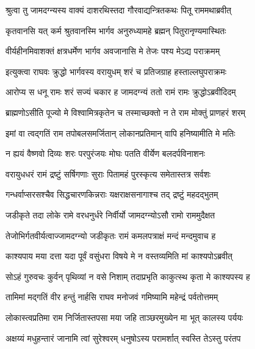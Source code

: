 
\twolineshloka
{श्रुत्वा तु जामदग्न्यस्य वाक्यं दाशरथिस्तदा}
{गौरवाद्यन्त्रितकथः पितू राममथाब्रवीत्} %

\twolineshloka
{कृतवानसि यत् कर्म श्रुतवानस्मि भार्गव}
{अनुरुध्यामहे ब्रह्मन् पितुरानृण्यमास्थितः} %

\twolineshloka
{वीर्यहीनमिवाशक्तं क्षत्रधर्मेण भार्गव}
{अवजानासि मे तेजः पश्य मेऽद्य पराक्रमम्} %

\twolineshloka
{इत्युक्त्वा राघवः क्रुद्धो भार्गवस्य वरायुधम्}
{शरं च प्रतिजग्राह हस्ताल्लघुपराक्रमः} %

\twolineshloka
{आरोप्य स धनू रामः शरं सज्यं चकार ह}
{जामदग्न्यं ततो रामं रामः क्रुद्धोऽब्रवीदिदम्} %

\twolineshloka
{ब्राह्मणोऽसीति पूज्यो मे विश्वामित्रकृतेन च}
{तस्माच्छक्तो न ते राम मोक्तुं प्राणहरं शरम्} %

\twolineshloka
{इमां वा त्वद्गतिं राम तपोबलसमर्जितान्}
{लोकानप्रतिमान् वापि हनिष्यामीति मे मतिः} %

\twolineshloka
{न ह्ययं वैष्णवो दिव्यः शरः परपुरंजयः}
{मोघः पतति वीर्येण बलदर्पविनाशनः} %

\twolineshloka
{वरायुधधरं रामं द्रष्टुं सर्षिगणाः सुराः}
{पितामहं पुरस्कृत्य समेतास्तत्र सर्वशः} %

\twolineshloka
{गन्धर्वाप्सरसश्चैव सिद्धचारणकिन्नराः}
{यक्षराक्षसनागाश्च तद् द्रष्टुं महदद्भुतम्} %

\twolineshloka
{जडीकृते तदा लोके रामे वरधनुर्धरे}
{निर्वीर्यो जामदग्न्योऽसौ रामो राममुदैक्षत} %

\twolineshloka
{तेजोभिर्गतवीर्यत्वाज्जामदग्न्यो जडीकृतः}
{रामं कमलपत्राक्षं मन्दं मन्दमुवाच ह} %

\twolineshloka
{काश्यपाय मया दत्ता यदा पूर्वं वसुंधरा}
{विषये मे न वस्तव्यमिति मां काश्यपोऽब्रवीत्} %

\twolineshloka
{सोऽहं गुरुवचः कुर्वन् पृथिव्यां न वसे निशाम्}
{तदाप्रभृति काकुत्स्थ कृता मे काश्यपस्य ह} %

\twolineshloka
{तामिमां मद्गतिं वीर हन्तुं नार्हसि राघव}
{मनोजवं गमिष्यामि महेन्द्रं पर्वतोत्तमम्} %

\twolineshloka
{लोकास्त्वप्रतिमा राम निर्जितास्तपसा मया}
{जहि ताञ्छरमुख्येन मा भूत् कालस्य पर्ययः} %

\twolineshloka
{अक्षय्यं मधुहन्तारं जानामि त्वां सुरेश्वरम्}
{धनुषोऽस्य परामर्शात् स्वस्ति तेऽस्तु परंतप} %

